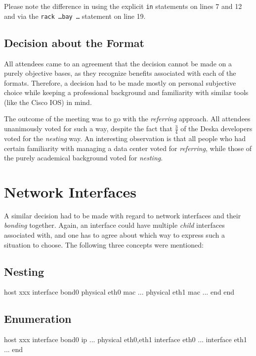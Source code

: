 \documentclass[12pt]{article}
\begin{document}
Please note the difference in using the explicit {\tt in} statements on lines 7
and 12 and via the {\tt rack \ldots bay \ldots} statement on line 19.

\subsection{Decision about the Format}

All attendees came to an agreement that the decision cannot be made on a purely
objective bases, as they recognize benefits associated with each of the formats.
Therefore, a decision had to be made mostly on personal subjective choice while
keeping a professional background and familiarity with similar tools (like the
Cisco IOS) in mind.

The outcome of the meeting was to go with the {\em referring} approach.  All
attendees unanimously voted for such a way, despite the fact that $\frac{3}{4}$
of the Deska developers voted for the {\em nesting} way.  An interesting
observation is that all people who had certain familiarity with managing a data
center voted for {\em referring}, while those of the purely academical
background voted for {\em nesting}.

\section{Network Interfaces}

A similar decision had to be made with regard to network interfaces and their
{\em bonding} together.  Again, an interface could have multiple {\em child}
interfaces associated with, and one has to agree about which way to express such
a situation to choose.  The following three concepts were mentioned:

\subsection{Nesting}
\begin{listing}{1}
host xxx
    interface bond0
        physical eth0 mac ...
        physical eth1 mac ...
    end
end
\end{listing}

\subsection{Enumeration}
\begin{listing}{1}
host xxx
    interface bond0 ip ... physical eth0,eth1
    interface eth0 ...
    interface eth1 ...
end
\end{listing}
\end{document}
